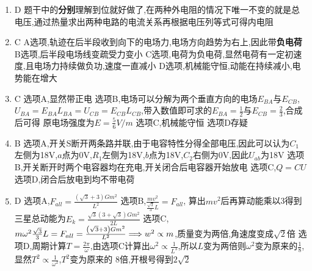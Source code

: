 \begin{enumerate}
            \item D     \newline
            题干中的\textbf{分别}理解到位就好做了,在两种外电阻的情况下唯一不变的就是总电压,通过热量求出两种电路的电流关系再根据电压列等式可得内电阻
            \item C  \newline
            A选项,轨迹在后半段收到向下的电场力,电场方向趋势为右上,因此带\textbf{负电荷}     \newline
            B选项,后半段电场线变疏受力变小      \newline
            C选项,电荷为负电荷,显然电荷有一定初速度,且电场力持续做负功,速度一直减小     \newline 
            D选项,机械能守恒,动能在持续减小,电势能在增大
            \item C \newline 
            选项A,显然带正电    \newline 
            选项B,电场可以分解为两个垂直方向的电场$E_{BA}$与$E_{CB}$,$U_{BA} = E_{BA} L_{BA} = U_{CB} = E_{CB} L_{CB}$,带入数值即可求的$E_{BA} = \frac{1}{2}$与$E_{CB} = \frac{2}{3}$,合成后可得
            原电场强度为$ E = \frac{5}{6} V/m $     \newline 
            选项C,机械能守恒    \newline 
            选项D存疑
            \item B     \newline 
            选项A,开关S断开两条路并联,由于电容特性分得全部电压,因此可以认为$C_{1}$左侧为18V,$a$点为0V,$R_{1}$左侧为18V,$b$点为18V,$C_{2}$右侧为0V,因此$U_{ab}$为18V     \newline 
            选项B,开关断开时两个电容器均在充电,开关闭合后电容器开始放电     \newline 
            选项C,$ Q = CU $    \newline 
            选项D,闭合后放电到均不带电荷
            \item D     \newline  
            选项A,$F_{all} =  \frac{ \left(\sqrt{3} + 3 \right)  G m^{2} }{L^{2}}$    \newline 
            选项B,$ \frac{m v^{2}}{\frac{\sqrt{3}}{3} L} = F_{all} $, 算出$mv^{2}$后再算动能乘以3得到三星总动能为$ E_{k} = \frac{\sqrt{3} \left( 3 + \sqrt{3} \right) G m^{2} }{2L} $   \newline 
            选项C,$ m \omega^{2} \frac{\sqrt{3}}{3} L = F_{all} = \frac{ \left(\sqrt{3} + 3 \right)  G m^{2} }{L^{2}} \Longrightarrow w^{2} \propto m $,质量变为两倍,角速度变成$\sqrt{2}$倍    \newline 
            选项D,周期计算$ T = \frac{2\pi}{\omega} $,由选项C计算出$ \omega^{2} \propto \frac{1}{L^{3}} $,所以$L$变为两倍则$\omega^{2}$变为原来的$\frac{1}{8}$,显然$ T^{2} \propto \frac{1}{\omega^{2}} $,$T^{2}$变为原来的
            8倍,开根号得到$2\sqrt{2}$

        \end{enumerate}


